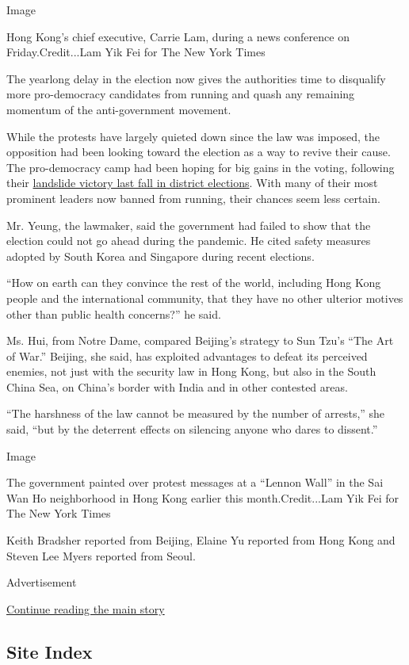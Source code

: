 Image

Hong Kong's chief executive, Carrie Lam, during a news conference on
Friday.Credit...Lam Yik Fei for The New York Times

The yearlong delay in the election now gives the authorities time to
disqualify more pro-democracy candidates from running and quash any
remaining momentum of the anti-government movement.

While the protests have largely quieted down since the law was imposed,
the opposition had been looking toward the election as a way to revive
their cause. The pro-democracy camp had been hoping for big gains in the
voting, following their
\href{https://www.nytimes3xbfgragh.onion/2019/11/25/world/asia/hong-kong-election-protests.html}{landslide
victory last fall in district elections}. With many of their most
prominent leaders now banned from running, their chances seem less
certain.

Mr. Yeung, the lawmaker, said the government had failed to show that the
election could not go ahead during the pandemic. He cited safety
measures adopted by South Korea and Singapore during recent elections.

``How on earth can they convince the rest of the world, including Hong
Kong people and the international community, that they have no other
ulterior motives other than public health concerns?'' he said.

Ms. Hui, from Notre Dame, compared Beijing's strategy to Sun Tzu's ``The
Art of War.'' Beijing, she said, has exploited advantages to defeat its
perceived enemies, not just with the security law in Hong Kong, but also
in the South China Sea, on China's border with India and in other
contested areas.

``The harshness of the law cannot be measured by the number of
arrests,'' she said, ``but by the deterrent effects on silencing anyone
who dares to dissent.''

Image

The government painted over protest messages at a ``Lennon Wall'' in the
Sai Wan Ho neighborhood in Hong Kong earlier this month.Credit...Lam Yik
Fei for The New York Times

Keith Bradsher reported from Beijing, Elaine Yu reported from Hong Kong
and Steven Lee Myers reported from Seoul.

Advertisement

\protect\hyperlink{after-bottom}{Continue reading the main story}

\hypertarget{site-index}{%
\subsection{Site Index}\label{site-index}}

